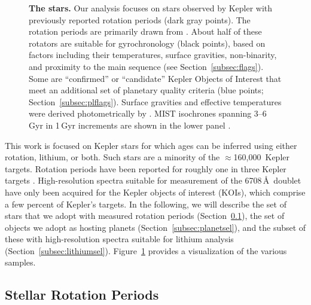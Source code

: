 \documentclass[11pt,twocolumn,tighten]{aastex63}
\newcommand{\nkeplerstars}{$\approx$160{,}000}
\begin{document}
\begin{figure}[!t]
	\begin{center}
	
	\end{center}
	\vspace{-0.5cm}
	\caption{
    {\bf The stars.}  Our analysis focuses on stars observed by Kepler
    with previously reported rotation periods (dark gray points).  The
    rotation periods are primarily drawn from
    \citet{Santos_2019,Santos_2021}.  About half of these rotators are
    suitable for gyrochronology (black points), based on factors
    including their temperatures, surface gravities, non-binarity, and
    proximity to the main sequence (see Section~\ref{subsec:flags}).
    Some are ``confirmed'' or ``candidate'' Kepler Objects of Interest
    that meet an additional set of planetary quality criteria (blue
    points; Section~\ref{subsec:plflags}).  Surface gravities and
    effective temperatures were derived photometrically by
    \citet{Berger_2020a_catalog}.
    MIST isochrones spanning 3--6\,Gyr in 1\,Gyr increments 
    are shown in the lower panel \citep{Choi_2016} .
	}
	\label{fig:stellarprops}
\end{figure}

This work is focused on Kepler stars for which ages can be inferred
using either rotation, lithium, or both.  Such stars
are a minority of the \nkeplerstars\ Kepler targets.  Rotation periods
have been reported for roughly one in three Kepler targets
\citep[e.g.][]{McQuillan_2014,Santos_2021}.  High-resolution spectra
suitable for measurement of the  6708\,\AA\ doublet have
only been acquired for the Kepler objects of interest (KOIs), which
comprise a few percent of Kepler's targets.  In the following, we will
describe the set of stars that we adopt with measured rotation periods
(Section~\ref{subsec:rotsel}), the set of objects we adopt as hosting planets
(Section~\ref{subsec:planetsel}), and the subset of these with
high-resolution spectra suitable for lithium analysis
(Section~\ref{subsec:lithiumsel}).  Figure~\ref{fig:stellarprops}
provides a visualization of the various samples.


\subsection{Stellar Rotation Periods}
\label{subsec:rotsel}
\end{document}
